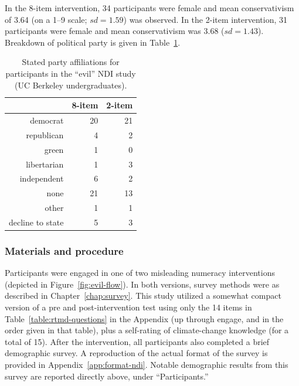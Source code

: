 In the 8-item intervention, 34 participants were female and mean conservativism
of 3.64 (on a 1--9 scale; $sd=1.59$) was observed. In the 2-item intervention,
31 participants were female and mean conservativism was 3.68 ($sd=1.43$).
Breakdown of political party is given in Table~\ref{table:evil-party}.

\begin{table}[ht]
\caption{Stated party affiliations for participants in the “evil” NDI study (UC
    Berkeley undergraduates).}
\label{table:evil-party}
\centering
\begin{tabular}{rrr}
  \toprule
     & 8-item & 2-item \\ 
  \midrule
  democrat &  20 &  21 \\ 
  republican &   4 &   2 \\ 
  green &   1 &   0 \\ 
  libertarian &   1 &   3 \\ 
  independent &   6 &   2 \\ 
  none &  21 &  13 \\ 
  other &   1 &   1 \\ 
  decline to state &   5 &   3 \\ 
   \bottomrule
\end{tabular}
\end{table}

\subsubsection{Materials and procedure}

Participants were engaged in one of two misleading numeracy
interventions (depicted in Figure~\ref{fig:evil-flow}). In both versions, survey
methods were as described in Chapter~\ref{chap:survey}. This study utilized a
somewhat compact version of a pre and post-intervention test using only the 14
items in Table~\ref{table:rtmd-questions} in the Appendix (up through
\textsf{engage}, and in the order given in that table), plus a self-rating of
climate-change knowledge (for a total of 15).  After the intervention, all
participants also completed a brief demographic survey.  A reproduction of the
actual format of the survey is provided in Appendix~\ref{app:format-ndi}.
Notable demographic results from this survey are reported directly above, under
“Participants.”

